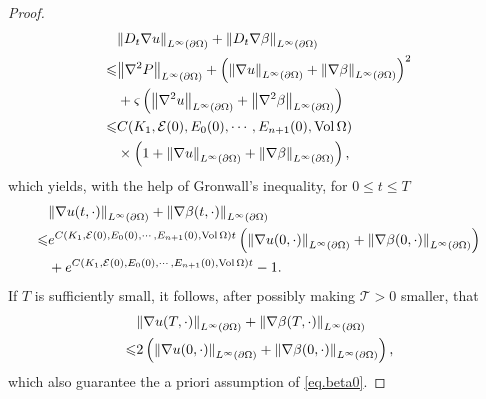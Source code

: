 \documentclass[12pt,reqno]{amsart}
\numberwithin{equation}{section}
\theoremstyle{definition}
\theoremstyle{remark}
\begin{document}
\begin{proof}
  \begin{align*}
    &{\left\Vert{D_t{\nabla} u}\right\Vert}_{L^\infty({\partial}\Omega)}+{\left\Vert{D_t{\nabla}\beta}\right\Vert}_{L^\infty({\partial}\Omega)}\\
    {\leqslant}& {\left\Vert{{\nabla}^2{P }}\right\Vert}_{L^\infty({\partial}\Omega)}+\left({\left\Vert{{\nabla} u}\right\Vert}_{L^\infty({\partial}\Omega)}+{\left\Vert{{\nabla} \beta}\right\Vert}_{L^\infty({\partial}\Omega)}\right)^2{\nonumber}\\
    &+{\varsigma}\left({\left\Vert{{\nabla}^2 u}\right\Vert}_{L^\infty({\partial}\Omega)}+{\left\Vert{{\nabla}^2 \beta}\right\Vert}_{L^\infty({\partial}\Omega)}\right){\nonumber}\\
    {\leqslant}& C(K_1,{\mathcal{E}}(0),E_0(0),\cdots, E_{n+1}(0),{\mathrm{Vol}\,}\Omega)\\
    &\times\left(1+{\left\Vert{{\nabla} u}\right\Vert}_{L^\infty({\partial}\Omega)}+{\left\Vert{{\nabla} \beta}\right\Vert}_{L^\infty({\partial}\Omega)}\right),
  \end{align*}
  which yields, with the help of Gronwall's inequality, for $0{\leqslant} t{\leqslant} T$
  \begin{align}
    &{\left\Vert{{\nabla} u(t,\cdot)}\right\Vert}_{L^\infty({\partial}\Omega)}+{\left\Vert{{\nabla} \beta(t,\cdot)}\right\Vert}_{L^\infty({\partial}\Omega)}{\nonumber}\\
{\leqslant} &e^{C(K_1,{\mathcal{E}}(0),E_0(0),\cdots, E_{n+1}(0),{\mathrm{Vol}\,}\Omega)t}\left({\left\Vert{{\nabla} u(0,\cdot)}\right\Vert}_{L^\infty({\partial}\Omega)}+{\left\Vert{{\nabla} \beta(0,\cdot)}\right\Vert}_{L^\infty({\partial}\Omega)}\right){\nonumber}\\
    &+e^{C(K_1,{\mathcal{E}}(0),E_0(0),\cdots, E_{n+1}(0),{\mathrm{Vol}\,}\Omega)t}-1.
  \end{align}
  If $T$ is sufficiently small, it follows, after possibly making ${\mathcal{T}}>0$ smaller, that
  \begin{align}\label{eq.7.45}
    &{\left\Vert{{\nabla} u(T,\cdot)}\right\Vert}_{L^\infty({\partial}\Omega)}+{\left\Vert{{\nabla} \beta(T,\cdot)}\right\Vert}_{L^\infty({\partial}\Omega)}{\nonumber}\\
{\leqslant}& 2\left({\left\Vert{{\nabla} u(0,\cdot)}\right\Vert}_{L^\infty({\partial}\Omega)}+{\left\Vert{{\nabla} \beta(0,\cdot)}\right\Vert}_{L^\infty({\partial}\Omega)}\right),
  \end{align}
  which also guarantee the a priori assumption of \eqref{eq.beta0}.


\end{proof}
\end{document}
